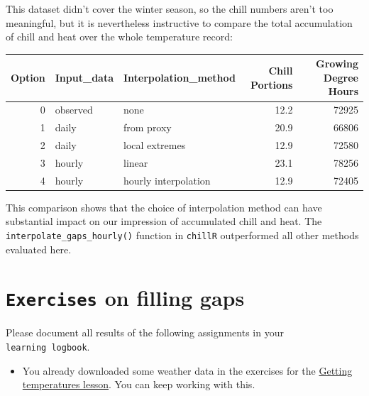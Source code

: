 \documentclass[
]{book}
\providecommand{\tightlist}{%
  \setlength{\itemsep}{0pt}\setlength{\parskip}{0pt}}
\begin{document}
This dataset didn't cover the winter season, so the chill numbers aren't too meaningful, but it is nevertheless instructive to compare the total accumulation of chill and heat over the whole temperature record:

\begingroup\fontsize{10}{12}\selectfont

\begin{tabular}{r|l|l|r|r}
\hline
Option & Input\_data & Interpolation\_method & Chill Portions & Growing Degree Hours\\
\hline
0 & observed & none & 12.2 & 72925\\
\hline
1 & daily & from proxy & 20.9 & 66806\\
\hline
2 & daily & local extremes & 12.9 & 72580\\
\hline
3 & hourly & linear & 23.1 & 78256\\
\hline
4 & hourly & hourly interpolation & 12.9 & 72405\\
\hline
\end{tabular}
\endgroup{}

This comparison shows that the choice of interpolation method can have substantial impact on our impression of accumulated chill and heat. The \texttt{interpolate\_gaps\_hourly()} function in \texttt{chillR} outperformed all other methods evaluated here.

\hypertarget{exercises_patching}{%
\section*{\texorpdfstring{\texttt{Exercises} on filling gaps}{Exercises on filling gaps}}\label{exercises_patching}}

Please document all results of the following assignments in your \texttt{learning\ logbook}.

\begin{itemize}
\tightlist
\item
  You already downloaded some weather data in the exercises for the \protect\hyperlink{get_temp_data}{Getting temperatures lesson}. You can keep working with this.
\end{itemize}
\end{document}
